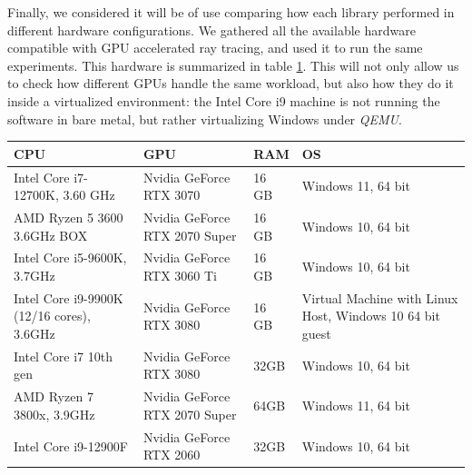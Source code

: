 
Finally, we considered it will be of use comparing how each library performed in different hardware configurations. We gathered all the available hardware compatible with GPU accelerated ray tracing, and used it to run the same experiments. This hardware is summarized in table \ref{pc-specs-table}. This will not only allow us to check how different GPUs handle the same workload, but also how they do it inside a virtualized environment: the Intel Core i9 machine is not running the software in bare metal, but rather virtualizing Windows under \textit{QEMU}.

\begin{center}
  \begin{table}
  \begin{tabular}{ | m{5cm} | m{3.5cm}| m{2cm}|m{4cm} |}
  \hline
  CPU& GPU& RAM& OS\\
  \hline
    Intel Core i7-12700K, 3.60 GHz& Nvidia GeForce RTX 3070& 16 GB& Windows 11, 64 bit\\ %
  \hline
    AMD Ryzen 5 3600 3.6GHz BOX& Nvidia GeForce RTX 2070 Super& 16 GB& Windows 10, 64 bit\\ %
  \hline
    Intel Core i5-9600K, 3.7GHz& Nvidia GeForce RTX 3060 Ti& 16 GB& Windows 10, 64 bit\\ %
  \hline
    Intel Core i9-9900K (12/16 cores), 3.6GHz& Nvidia GeForce RTX 3080& 16 GB& Virtual Machine with Linux Host, Windows 10 64 bit guest\\ %
  \hline
    Intel Core i7 10th gen& Nvidia GeForce RTX 3080& 32GB& Windows 10, 64 bit\\ %
  \hline
    AMD Ryzen 7 3800x, 3.9GHz& Nvidia GeForce RTX 2070 Super& 64GB& Windows 11, 64 bit\\ %
  \hline
    Intel Core i9-12900F& Nvidia GeForce RTX 2060& 32GB& Windows 10, 64 bit\\ %
  \hline
\end{tabular}
  \label{pc-specs-table}
\end{table}
\end{center}
